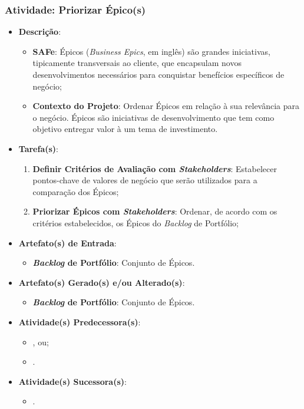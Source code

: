 			\subsubsection[Atividade: Priorizar Épico(s)]{Atividade: Priorizar Épico(s)}
			\label{subsubsec:processo_atividade_portfolio_priorizar_epico}
				\begin{itemize}
					\item{\textbf{Descrição}:
						\begin{itemize}
							\item{\textbf{SAFe}: Épicos (\emph{Business Epics}, em inglês) são grandes iniciativas, tipicamente transversais ao cliente, que encapsulam novos desenvolvimentos necessários para conquistar benefícios específicos de negócio;}
							\item{\textbf{Contexto do Projeto}: Ordenar Épicos em relação à sua relevância para o negócio. Épicos são iniciativas de desenvolvimento que tem como objetivo entregar valor à um tema de investimento.}
						\end{itemize}}
					\item{\textbf{Tarefa(s)}:
						\begin{enumerate}
							\item{\textbf{Definir Critérios de Avaliação com \emph{Stakeholders}}: Estabelecer pontos-chave de valores de negócio que serão utilizados para a comparação dos Épicos;}
							\item{\textbf{Priorizar Épicos com \emph{Stakeholders}}: Ordenar, de acordo com os critérios estabelecidos, os Épicos do \emph{Backlog} de Portfólio;}
						\end{enumerate}}
					\item{\textbf{Artefato(s) de Entrada}:
						\begin{itemize}
							\item{\textbf{\emph{Backlog} de Portfólio}: Conjunto de Épicos.}
						\end{itemize}}
					\item{\textbf{Artefato(s) Gerado(s) e/ou Alterado(s)}:
						\begin{itemize}
							\item{\textbf{\emph{Backlog} de Portfólio}: Conjunto de Épicos.}
						\end{itemize}}
					\item{\textbf{Atividade(s) Predecessora(s)}:
						\begin{itemize}
							\item{, ou;}
							\item{.}
						\end{itemize}}
					\item{\textbf{Atividade(s) Sucessora(s)}:
						\begin{itemize}
							\item{.}
						\end{itemize}}
				\end{itemize}

